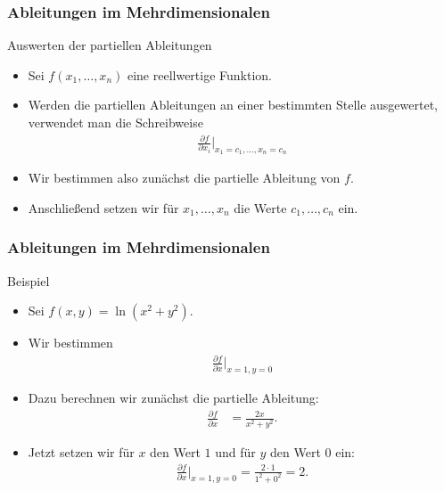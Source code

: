 \documentclass{beamer}
\renewcommand{\ae}{\"a}
\newcommand{\ue}{\"u}
\newcommand{\mytitle}{Ableitungen im Mehrdimensionalen}
\begin{document}
\begin{frame}\frametitle{\mytitle}
	\begin{block}{Auswerten der partiellen Ableitungen}
		\begin{itemize}
			\item Sei $f(x_1,\ldots,x_n)$ eine reellwertige Funktion.
			\item Werden die partiellen Ableitungen an einer bestimmten Stelle ausgewertet, verwendet man die Schreibweise
				\begin{align*}
					\frac{\partial f}{\partial x_i}\bigg|_{x_1=c_1,\ldots,x_n=c_n}
				\end{align*}
			\item Wir bestimmen also zun\ae chst die partielle Ableitung von $f$. 
			\item Anschlie\ss end setzen wir f\ue r $x_1,\ldots,x_n$ die Werte $c_1,\ldots,c_n$ ein.
		\end{itemize}
	\end{block}
\end{frame}

\begin{frame}\frametitle{\mytitle}
	\begin{block}{Beispiel}
		\begin{itemize}
			\item Sei $f(x,y)=\ln(x^2+y^2)$.
			\item Wir bestimmen
				\begin{align*}
					\frac{\partial f}{\partial x}\bigg|_{x=1,y=0}
				\end{align*}
			\item Dazu berechnen wir zun\ae chst die partielle Ableitung:
				\begin{align*}
					\frac{\partial f}{\partial x}&=\frac{2x}{x^2+y^2}.
				\end{align*}
			\item Jetzt setzen wir f\ue r $x$ den Wert $1$ und f\ue r $y$ den Wert $0$ ein:
\begin{align*}
					\frac{\partial f}{\partial x}\bigg|_{x=1,y=0}=\frac{2\cdot 1}{1^2+0^2}=2.
				\end{align*}
		\end{itemize}
	\end{block}
\end{frame}
\end{document}
